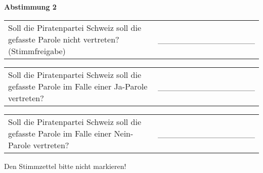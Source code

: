 \documentclass[11pt, a4paper]{scrartcl}
\begin{document}
{\begin{minipage}[t][12.5cm][t]{17.5cm}
\vspace{0.5cm}

\textbf{Abstimmung 2}

\vspace{0.5cm}

\begin{tabular}{ b{13.5cm} b{3cm} }
Soll die Piratenpartei Schweiz soll die gefasste Parole nicht vertreten? (Stimmfreigabe)
& \_\_\_\_\_\_\_\_\_\_\_\_\_\_\_\_ \\
\end{tabular}

\vspace{0.5cm}

\begin{tabular}{ b{13.5cm} b{3cm} }
Soll die Piratenpartei Schweiz soll die gefasste Parole im Falle einer Ja-Parole vertreten?
& \_\_\_\_\_\_\_\_\_\_\_\_\_\_\_\_ \\
\end{tabular}

\vspace{0.5cm}

\begin{tabular}{ b{13.5cm} b{3cm} }
Soll die Piratenpartei Schweiz soll die gefasste Parole im Falle einer Nein-Parole vertreten?
& \_\_\_\_\_\_\_\_\_\_\_\_\_\_\_\_ \\
\end{tabular}

\vspace{0.5cm}

Den Stimmzettel bitte nicht markieren!

\end{minipage}


}
\end{document}
